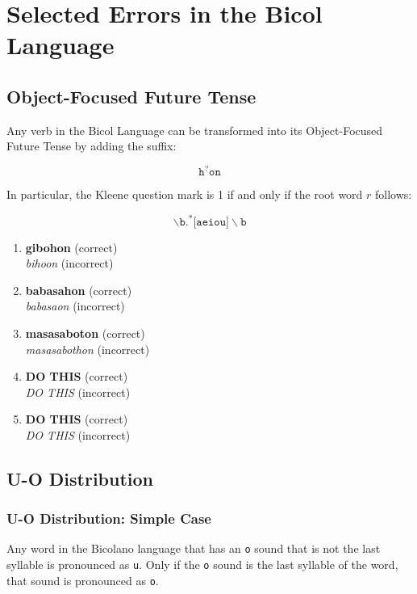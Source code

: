 \section{Selected Errors in the Bicol Language}
\subsection{Object-Focused Future Tense}
Any verb in the Bicol Language can be transformed into its Object-Focused Future Tense by adding the suffix:

\[
      \texttt{h}^?\texttt{on}
\]

In particular, the Kleene question mark is 1 if and only if the root word $r$ follows:

\[
      \backslash\texttt{b.}^*\texttt{[aeiou]}\backslash\texttt{b}
\]

\begin{example}
\end{example}

\begin{enumerate}
      \item \textbf{gibohon} (correct) \\
            \textit{bihoon} (incorrect)
      \item \textbf{babasahon} (correct) \\
            \textit{babasaon} (incorrect)
      \item \textbf{masasaboton} (correct) \\
            \textit{masasabothon} (incorrect)
      \item \textbf{DO THIS} (correct) \\
            \textit{DO THIS} (incorrect)
      \item \textbf{DO THIS} (correct) \\
            \textit{DO THIS} (incorrect)
\end{enumerate}

\subsection{U-O Distribution}

\subsubsection{U-O Distribution: Simple Case}
Any word in the Bicolano language that has an \texttt{o} sound that is not the last syllable is pronounced as \texttt{u}. Only if the \texttt{o} sound is the last syllable of the word, that sound is pronounced as \texttt{o}.

